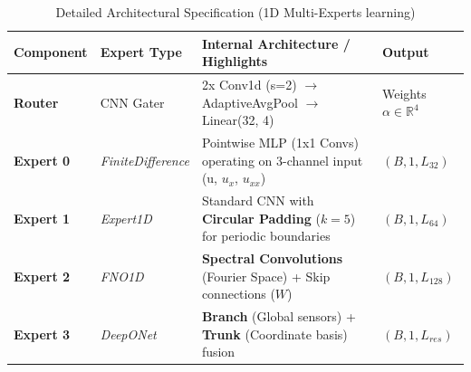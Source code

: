 \documentclass[preprint,12pt,authoryear]{elsarticle}
\begin{document}
\begin{table}[h!]
\centering
\small
\caption{Detailed Architectural Specification (1D Multi-Experts learning)}
\label{tab:softmax_combiner}
\begin{tabularx}{\textwidth}{@{}llXl@{}}
\toprule
\textbf{Component} & \textbf{Expert Type} & \textbf{Internal Architecture / Highlights} & \textbf{Output} \\ \midrule
\textbf{Router} & CNN Gater & 2x Conv1d (s=2) $\rightarrow$ AdaptiveAvgPool $\rightarrow$ Linear(32, 4) & Weights $\alpha \in \mathbb{R}^4$ \\ \midrule
\textbf{Expert 0} & \textit{FiniteDifference} & Pointwise MLP (1x1 Convs) operating on 3-channel input (u, $u_x$, $u_{xx}$) & $(B, 1, L_{32})$ \\ \addlinespace
\textbf{Expert 1} & \textit{Expert1D} & Standard CNN with \textbf{Circular Padding} ($k=5$) for periodic boundaries & $(B, 1, L_{64})$ \\ \addlinespace
\textbf{Expert 2} & \textit{FNO1D} & \textbf{Spectral Convolutions} (Fourier Space) + Skip connections ($W$) & $(B, 1, L_{128})$ \\ \addlinespace
\textbf{Expert 3} & \textit{DeepONet} & \textbf{Branch} (Global sensors) + \textbf{Trunk} (Coordinate basis) fusion & $(B, 1, L_{res})$ \\ \bottomrule
\end{tabularx}
\end{table}
\end{document}
